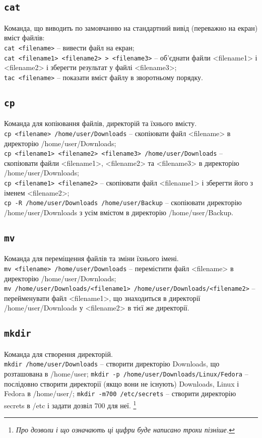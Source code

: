 \documentclass[10pt,a4paper]{fancyhandout}
\begin{document}
\subsection{\texttt{cat}}
Команда, що виводить по замовчанню на стандартний вивід (переважно на екран) вміст файлів: \\
\texttt{cat <filename>} -- вивести файл на екран; \\
\texttt{cat <filename1> <filename2> > <filename3>} -- об'єднати файли <filename1> і <filename2> і зберегти результат у файлі <filename3>; \\
\texttt{tac <filename>} -- показати вміст файлу в зворотньому порядку.
\goodbreak

\subsection{\texttt{cp}}
Команда для копіювання файлів, директорій та їхнього вмісту. \\
\texttt{cp <filename> /home/user/Downloads} -- скопіювати файл <filename> в директорію /home/user/Downloads; \\
\texttt{cp <filename1> <filename2> <filename3> /home/user/Downloads} -- скопіювати файли <filename1>, <filename2> та <filename3> в директорію /home/user/Downloads; \\
\texttt{cp <filename1> <filename2>} -- скопіювати файл <filename1> і зберегти його з іменем <filename2>; \\
\texttt{cp -R /home/user/Downloads /home/user/Backup} -- скопіювати директорію /home/user/Downloads з усім вмістом в директорію /home/user/Backup.
\goodbreak

\subsection{\texttt{mv}}
Команда для переміщення файлів та зміни їхнього імені. \\
\texttt{mv <filename> /home/user/Downloads} -- перемістити файл <filename> в директорію /home/user/Downloads; \\
\texttt{mv /home/user/Downloads/<filename1> /home/user/Downloads/<filename2>} -- перейменувати файл <filename1>, що знаходиться в директорії /home/user/Downloads у <filename2> в тієї же директорії. 
\goodbreak

\subsection{\texttt{mkdir}}
Команда для створення директорій. \\
\texttt{mkdir /home/user/Downloads} -- створити директорію Downloads, що розташована в /home/user;
\texttt{mkdir -p /home/user/Downloads/Linux/Fedora} -- послідовно створити директорії (якщо вони не існують) Downloads, Linux і Fedora в /home/user/;
\texttt{mkdir -m700 /etc/secrets} -- створити директорію secrets в /etc і задати дозвіл 700 для неї.
\footnote{\textit{Про дозволи і що означають ці цифри буде написано трохи пізніше. }}
\goodbreak
\end{document}
